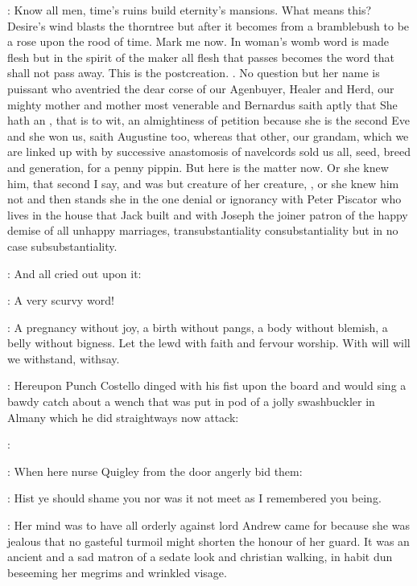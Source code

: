 \documentclass[12pt]{article}
\begin{document}
\SD: Know all men, time's ruins build eternity's mansions.
What means this? Desire's wind blasts the thorntree
but after it becomes from a bramblebush to be a
rose upon the rood of time. Mark me now. In woman's womb word is made
flesh but in the spirit of the maker all flesh that passes becomes the
word that shall not pass away. This is the postcreation.
.
No question but her name is puissant who aventried the dear corse
of our Agenbuyer, Healer and Herd, our mighty mother and mother most
venerable and Bernardus saith aptly that She hath an , that is to wit, an almightiness of petition because
she is the second Eve and she won us, saith Augustine too, whereas that
other, our grandam, which we are linked up with by successive anastomosis
of navelcords sold us all, seed, breed and generation, for a penny
pippin. But here is the matter now. Or she knew him, that second I say,
and was but creature of her creature, , or she knew him not and then stands she in the one denial or
ignorancy with Peter Piscator who lives in the house that Jack built and
with Joseph the joiner patron of the happy demise of all unhappy
marriages, 
 transubstantiality  consubstantiality
but in no case subsubstantiality.

: And all cried out upon it:

\All: A very scurvy word!

\SD: A pregnancy without joy, a birth without pangs, a body without
blemish, a belly without bigness. Let the lewd with faith and fervour
worship. With will will we withstand, withsay.


: Hereupon Punch Costello dinged with his fist upon the board and would
sing a bawdy catch  about a wench that was
put in pod of a jolly swashbuckler in Almany which he did straightways
now attack:

\PC: 

: When here nurse Quigley from the door angerly bid them:

\nq: Hist ye should shame you nor was it not meet as
I remembered you being.

: Her mind was to have all orderly against lord
Andrew came for because she was jealous that no gasteful turmoil might
shorten the honour of her guard.
It was an ancient and a sad matron of a sedate look and christian walking,
in habit dun beseeming her megrims and wrinkled visage.
\end{document}
